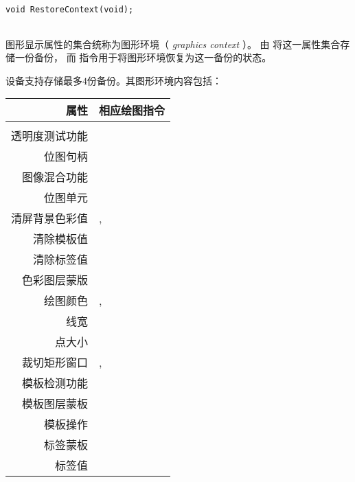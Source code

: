 
\begin{framed}
\begin{verbatim}
void RestoreContext(void);
\end{verbatim}
\end{framed}

\begin{tabular}{lp{}}

\end{tabular}

\vspace{10pt}
图形显示属性的集合统称为图形环境（ \textit{graphics context} ）。
由  将这一属性集合存储一份备份， 而  指令用于将图形环境恢复为这一备份的状态。

设备支持存储最多$4$份备份。其图形环境内容包括：
\vspace{10pt}

\begin{tabular}{rl}
属性 & 相应绘图指令 \\
\hline
\\
透明度测试功能   &  \nameref{AlphaFunc} \\
位图句柄         &  \nameref{BitmapHandle} \\
图像混合功能        &  \nameref{BlendFunc} \\
位图单元           &  \nameref{Cell} \\
清屏背景色彩值     & \nameref{ClearColorA}, \nameref{ClearColorRGB} \\
清除模板值   & \nameref{ClearStencil} \\
清除标签值       & \nameref{ClearTag} \\
色彩图层蒙版      & \nameref{ColorMask} \\
绘图颜色                 & \nameref{ColorA}, \nameref{ColorRGB} \\
线宽            & \nameref{LineWidth} \\
点大小            & \nameref{PointSize} \\
裁切矩形窗口     & \nameref{ScissorSize}, \nameref{ScissorXY} \\
模板检测功能 & \nameref{StencilFunc} \\
模板图层蒙板    & \nameref{StencilMask} \\
模板操作     & \nameref{StencilOp} \\
标签蒙板        & \nameref{TagMask} \\
标签值             & \nameref{Tag}
\end{tabular}




